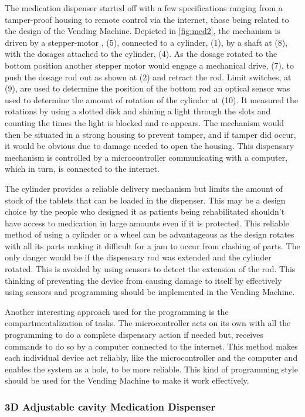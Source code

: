 \documentclass[a4paper,11pt]{article}
\newcommand*{\halfref}[1]{\hyperref[{#1}]{\autoref*{#1}}}
\numberwithin{figure}{section}
\numberwithin{table}{section}
\begin{document}
The medication dispenser started off with a few specifications ranging from a tamper-proof housing to remote control via the internet, those being related to the design of the Vending Machine. Depicted in  \halfref{fig:med2}, the mechanism is driven by a stepper-motor , (5), connected to a cylinder, (1), by a shaft at (8), with the dosages attached to the cylinder, (4). As the dosage rotated to the bottom position another stepper motor would engage a mechanical drive, (7), to push the dosage rod out as shown at (2) and retract the rod. Limit switches, at (9), are used to determine the position of the bottom rod an optical sensor was used to determine the amount of rotation of the cylinder at (10). It measured the rotations by using a slotted disk and shining a light through the slots and counting the times the light is blocked and re-appears. The mechanism would then be situated in a strong housing to prevent tamper, and if tamper did occur, it would be obvious due to damage needed to open the housing. This dispensary mechanism is controlled by a microcontroller communicating with a computer, which in turn, is connected to the internet. 

The cylinder provides a reliable delivery mechanism but limits the amount of stock of the tablets that can be loaded in the dispenser. This may be a design choice by the people who designed it as patients being rehabilitated shouldn't have access to medication in large amounts even if it is protected. This reliable method of using a cylinder or a wheel can be advantageous as the design rotates with all its parts making it difficult for a jam to occur from clashing of parts. The only danger would be if the dispensary rod was extended and the cylinder rotated. This is avoided by using sensors to detect the extension of the rod. This thinking of preventing the device from causing damage to itself by effectively using sensors and programming should be implemented in the Vending Machine.

Another interesting approach used for the programming is the compartmentalization of tasks. The microcontroller acts on its own with all the programming to do a complete dispensary action if needed but, receives commands to do so by a computer connected to the internet. This method makes each individual device act reliably, like the microcontroller and the computer and enables the system as a hole, to be more reliable. This kind of programming style should be used for the Vending Machine to make it work effectively.

\subsubsection{3D Adjustable cavity Medication Dispenser}
\label{subsec:med3}
\end{document}
